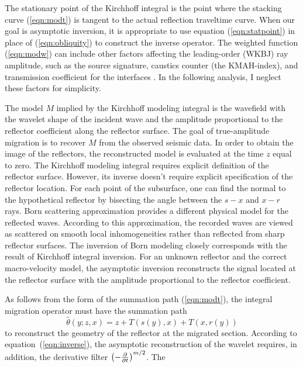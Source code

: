 The stationary point of the Kirchhoff integral is the point where the
stacking curve (\ref{eqn:modt}) is tangent to the actual reflection
traveltime curve. When our goal is asymptotic inversion, it is
appropriate to use equation (\ref{eqn:statpoint}) in place of
(\ref{eqn:obliquity}) to construct the inverse operator. The weighted
function (\ref{eqn:modw}) can include other factors affecting the
leading-order (WKBJ) ray amplitude, such as the source signature, 
caustics counter (the KMAH-index), and transmission coefficient
for the interfaces \cite[]{chapman,cerveny}. In the following analysis,
I neglect these factors for simplicity.
\par
The model $M$ implied by the Kirchhoff modeling integral is the
wavefield with the wavelet shape of the incident wave and the
amplitude proportional to the reflector coefficient along the
reflector surface. The goal of true-amplitude migration is to recover
$M$ from the observed seismic data. In order to obtain the image of
the reflectors, the reconstructed model is evaluated at the time $z$
equal to zero. The Kirchhoff modeling integral requires explicit
definition of the reflector surface. However, its inverse doesn't
require explicit specification of the reflector location. For each
point of the subsurface, one can find the normal to the hypothetical
reflector by bisecting the angle between the $s-x$ and $x-r$
rays. Born scattering approximation provides a different physical
model for the reflected waves. According to this approximation, the
recorded waves are viewed as scattered on smooth local inhomogeneities
rather than reflected from sharp reflector surfaces. The inversion of
Born modeling \cite[]{GEO52-07-09430964,GEO52-07-09310942} closely
corresponds with the result of Kirchhoff integral inversion. For an
unknown reflector and the correct macro-velocity model, the asymptotic
inversion reconstructs the signal located at the reflector surface
with the amplitude proportional to the reflector coefficient.
\par
As follows from the form of the summation path (\ref{eqn:modt}), the
integral migration operator must have the summation path
\begin{equation}
\widehat{\theta}(y;z,x)  =  z + T\left(s(y),x\right) + T\left(x,r(y)\right)
\end{equation}
to reconstruct the geometry of the reflector at the migrated section.
According to equation~(\ref{eqn:inverse}), the asymptotic
reconstruction of the wavelet requires, in addition, the derivative
filter $\left(- {\partial \over {\partial t}}\right)^{m/2}$. The
